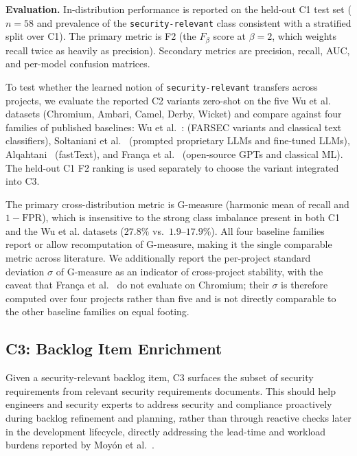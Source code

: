 \textbf{Evaluation.}
In-distribution performance is reported on the held-out C1 test set ($n=58$ and prevalence of the \texttt{security-relevant} class consistent with a stratified split over C1).
The primary metric is F2 (the $F_\beta$ score at $\beta = 2$, which weights recall twice as heavily as precision).
Secondary metrics are precision, recall, AUC, and per-model confusion matrices.

To test whether the learned notion of \texttt{security-relevant} transfers across projects, we evaluate the reported C2 variants zero-shot on the five Wu et al.~\cite{wu2022data-quality} datasets (Chromium, Ambari, Camel, Derby, Wicket) and compare against four families of published baselines: Wu et al.~\cite{wu2022data-quality}: (FARSEC variants and classical text classifiers), Soltaniani et al.~\cite{soltaniani2026evaluating-llms} (prompted proprietary LLMs and fine-tuned LLMs), Alqahtani~\cite{alqahtani2024fasttext} (fastText), and França et al.~\cite{franca2025gpts} (open-source GPTs and classical ML).
The held-out C1 F2 ranking is used separately to choose the variant integrated into C3.


The primary cross-distribution metric is G-measure (harmonic mean of recall and $1{-}\mathrm{FPR}$), which is insensitive to the strong class imbalance present in both C1 and the Wu et al. datasets ($27.8\%$ vs.\ $1.9$--$17.9\%$).
All four baseline families report or allow recomputation of G-measure, making it the single comparable metric across literature.
We additionally report the per-project standard deviation $\sigma$ of G-measure as an indicator of cross-project stability, with the caveat that França et al.~\cite{franca2025gpts} do not evaluate on Chromium; their $\sigma$ is therefore computed over four projects rather than five and is not directly comparable to the other baseline families on equal footing.

\subsection*{C3: Backlog Item Enrichment}\label{sec:methodology-c3}

Given a security-relevant backlog item, C3 surfaces the subset of security requirements from relevant security requirements documents.
This should help engineers and security experts to address security and compliance proactively during backlog refinement and planning, rather than through reactive checks later in the development lifecycle, directly addressing the lead-time and workload burdens reported by Moyón et al.~\cite{moyon2024challenges}.

